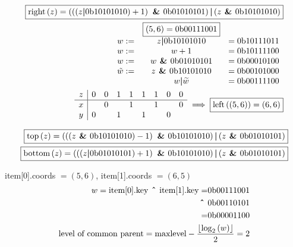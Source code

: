 \documentclass{article}
\newcommand{\bb}{0\textrm{b}}
\newcommand{\AND}{\textrm{\textbf{ \& }}}
\newcommand{\OR}{\textrm{\textbf{\textbar }}}
\newcommand{\XOR}{\textrm{\textbf{ \^{} }}}
\begin{document}
\begin{subequations}
    \begin{align}
        \boxed{%
        \textrm{right}\left(z\right) = \left(\left(\left(
            z \OR \bb10101010 \right) + 1 \right) \AND \bb01010101 \right)
            \OR \left( z \AND \bb10101010 \right)
        }\\
            \begin{array}{c c c}
                & \boxed{\left( 5, 6 \right) = \bb00111001} & \\
                w :=& z \OR \bb10101010 &= \bb10111011 \\
                w :=& w + 1 &= \bb10111100 \\
                w :=& w \AND \bb01010101 &= \bb00010100 \\
                \tilde{w} :=& z \AND \bb10101010 &= \bb00101000 \\
                & w \OR \widetilde{w} &= \bb00111100
            \end{array} \\
            \begin{array}{c | c c c c c c c c}
                z & 0 & 0 & 1 & 1 & 1 & 1 & 0 & 0 \\
                \hline
                x & & 0 & & 1 & & 1 & & 0 \\
                y & 0 & & 1 & & 1 & & 0 \\
            \end{array}
            \implies \boxed{\textrm{left}\left(\left(5, 6\right)\right) =
            \left(6, 6\right)}
    \end{align}
\end{subequations}

\begin{subequations}
    \begin{align}
        \Aboxed{%
            \textrm{top}\left(z\right) = \left(\left(\left(z \AND \bb10101010
            \right) -1 \right) \AND \bb10101010 \right) \OR \left( z \AND
            \bb01010101 \right)
        }\\
        \Aboxed{%
            \textrm{bottom}\left(z\right) = \left(\left(\left(z \OR \bb01010101
            \right) +1 \right) \AND \bb10101010 \right) \OR \left( z \AND
            \bb01010101 \right)
        }
    \end{align}
\end{subequations}

item[0].coords $= (5, 6)$, item[1].coords $= (6, 5)$
\begin{subequations}
\begin{align}
    \begin{split}
        w = \textrm{item[0].key} \XOR \textrm{item[1].key} =& \bb00111001 \\
        \XOR& \bb00110101 \\
        =& \bb00001100
    \end{split} \\
    \textrm{level of common parent} =
    \textrm{maxlevel}-\frac{\lfloor \log_2\left(w\right) \rfloor}{2} = 2
\end{align}
\end{subequations}
\end{document}
